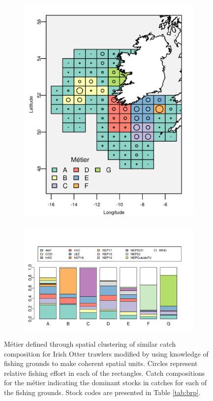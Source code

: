 \documentclass[12pt, halfline, a4paper]{ouparticle}
\begin{document}
\begin{figure}[!ht]
	\centering
\begin{subfigure}
	\centering
	\includegraphics[width=0.6\linewidth]{figures/Final_Metier_locations}
\end{subfigure}
\begin{subfigure}
	\centering
	\includegraphics[width=0.8\linewidth]{figures/Final_Metier_catchcomp}
\end{subfigure}
\caption{Métier defined through spatial clustering of similar catch
	composition for Irish Otter trawlers modified by using knowledge of
	fishing grounds to make coherent spatial units. Circles represent
	relative fishing effort in each of the rectangles. Catch compositions
	for the métier indicating the dominant stocks in catches for each of
	the fishing grounds. Stock codes are presented in Table \ref{tab:brp}.} 
	\label{fig:metier}

\end{figure}	
\end{document}
